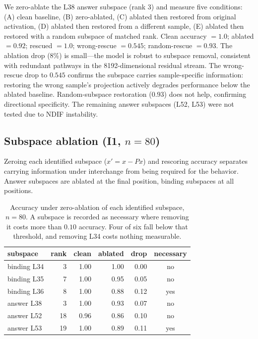 \documentclass{article}
\begin{document}
We zero-ablate the L38 answer subspace (rank 3) and measure five conditions: (A) clean baseline, (B) zero-ablated, (C) ablated then restored from original activation, (D) ablated then restored from a different sample, (E) ablated then restored with a random subspace of matched rank. Clean accuracy $= 1.0$; ablated $= 0.92$; rescued $= 1.0$; wrong-rescue $= 0.545$; random-rescue $= 0.93$. The ablation drop (8\%) is small---the model is robust to subspace removal, consistent with redundant pathways in the 8192-dimensional residual stream. The wrong-rescue drop to $0.545$ confirms the subspace carries sample-specific information: restoring the wrong sample's projection actively degrades performance below the ablated baseline. Random-subspace restoration ($0.93$) does not help, confirming directional specificity. The remaining answer subspaces (L52, L53) were not tested due to NDIF instability.

\subsection{Subspace ablation (I1, $n = 80$)}
\label{sec:ablation}

Zeroing each identified subspace ($x' = x - Px$) and rescoring accuracy separates carrying
information under interchange from being required for the behavior. Answer subspaces are
ablated at the final position, binding subspaces at all positions.

\begin{table}[h]
\centering
\small
\begin{tabular}{lrrrrc}
\toprule
subspace & rank & clean & ablated & drop & necessary \\
\midrule
binding L34 & 3 & 1.00 & 1.00 & 0.00 & no \\
binding L35 & 7 & 1.00 & 0.95 & 0.05 & no \\
binding L36 & 8 & 1.00 & 0.88 & 0.12 & yes \\
answer L38 & 3 & 1.00 & 0.93 & 0.07 & no \\
answer L52 & 18 & 0.96 & 0.86 & 0.10 & no \\
answer L53 & 19 & 1.00 & 0.89 & 0.11 & yes \\
\bottomrule
\end{tabular}
\caption{Accuracy under zero-ablation of each identified subspace, $n = 80$. A subspace is
recorded as necessary where removing it costs more than $0.10$ accuracy. Four of six fall
below that threshold, and removing L34 costs nothing measurable.}
\label{tab:ablation}
\end{table}
\end{document}
